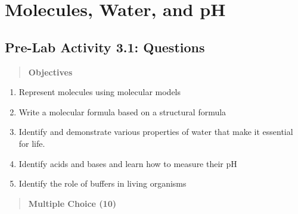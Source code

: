 \documentclass[
  letterpaper,
  DIV=11,
  numbers=noendperiod]{scrreprt}
\begin{document}

\chapter{\texorpdfstring{\textbf{Molecules, Water, and
pH}}{Molecules, Water, and pH}}\label{molecules-water-and-ph}

\section{\texorpdfstring{\textbf{Pre-Lab Activity 3.1:
Questions}}{Pre-Lab Activity 3.1: Questions}}\label{pre-lab-activity-3.1-questions}

\begin{quote}
\textbf{Objectives}
\end{quote}

\begin{enumerate}
\def\labelenumi{\arabic{enumi}.}
\item
  Represent molecules using molecular models
\item
  Write a molecular formula based on a structural formula
\item
  Identify and demonstrate various properties of water that make it
  essential for life.
\item
  Identify acids and bases and learn how to measure their pH
\item
  Identify the role of buffers in living organisms
\end{enumerate}

\begin{quote}
\textbf{Multiple Choice (10)}
\end{quote}
\end{document}
